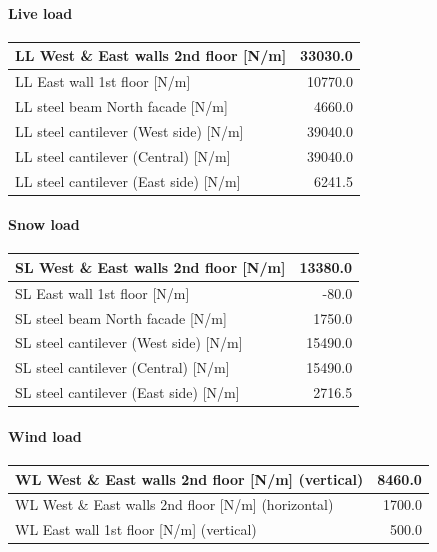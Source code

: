 \paragraph{Live load}
\begin{center}
  \begin{tabular}{|l|r|}
\hline
LL West \& East walls 2nd floor [N/m] &  33030.0 \\
\hline
LL East wall 1st floor [N/m] &  10770.0 \\
\hline
LL steel beam North facade [N/m] &  4660.0 \\
\hline
LL steel cantilever (West side) [N/m]  &  39040.0 \\
\hline
LL steel cantilever (Central) [N/m]  &  39040.0 \\
\hline
LL steel cantilever  (East side) [N/m]  &  6241.5 \\
\hline
\end{tabular}
\end{center}

\paragraph{Snow load}
\begin{center}
  \begin{tabular}{|l|r|}
\hline
SL West \& East walls 2nd floor [N/m] &  13380.0 \\
\hline
SL East wall 1st floor [N/m] &  -80.0 \\
\hline
SL steel beam North facade [N/m] &  1750.0 \\
\hline
SL steel cantilever (West side) [N/m]  &  15490.0 \\
\hline
SL steel cantilever (Central) [N/m]  &  15490.0 \\
\hline
SL steel cantilever  (East side) [N/m]  &  2716.5 \\
\hline
\end{tabular}
\end{center}

\paragraph{Wind load}
\begin{center}
  \begin{tabular}{|l|r|}
\hline
WL West \& East walls 2nd floor [N/m] (vertical) &  8460.0 \\
\hline
WL West \& East walls 2nd floor [N/m] (horizontal) &  1700.0 \\
\hline
WL East wall 1st floor [N/m]  (vertical) &  500.0 \\
\hline
\end{tabular}
\end{center}


